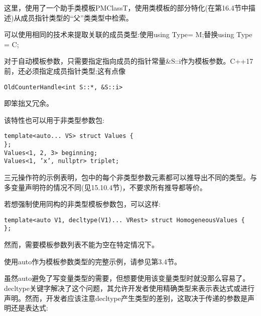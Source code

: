 这里，使用了一个助手类模板PMClassT，使用类模板的部分特化(在第16.4节中描述)从成员指针类型的“父”类类型中检索。

\begin{tcolorbox}[colback=webgreen!5!white,colframe=webgreen!75!black]
\hspace*{0.75cm}可以使用相同的技术来提取关联的成员类型:使用using Type= M;替换using Type = C;
\end{tcolorbox}

对于自动模板参数，只需要指定指向成员的指针常量\&S::i作为模板参数。C++17前，还必须指定成员指针类型;这有点像

\begin{lstlisting}[style=styleCXX]
OldCounterHandle<int S::*, &S::i>
\end{lstlisting}

即笨拙又冗余。

该特性也可以用于非类型参数包:

\begin{lstlisting}[style=styleCXX]
template<auto... VS> struct Values {
};
Values<1, 2, 3> beginning;
Values<1, ’x’, nullptr> triplet;
\end{lstlisting}

三元操作符的示例表明，包中的每个非类型参数元素都可以推导出不同的类型。与多变量声明符的情况不同(见15.10.4节)，不要求所有推导都等价。

若想强制使用同构的非类型模板参数包，可以这样:

\begin{lstlisting}[style=styleCXX]
template<auto V1, decltype(V1)... VRest> struct HomogeneousValues {
};
\end{lstlisting}

然而，需要模板参数列表不能为空在特定情况下。

使用auto作为模板参数类型的完整示例，请参见第3.4节。


虽然auto避免了写变量类型的需要，但想要使用该变量类型时就没那么容易了。decltype关键字解决了这个问题，其允许开发者使用精确类型来表示表达式或进行声明。然而，开发者应该注意decltype产生类型的差别，这取决于传递的参数是声明还是表达式:

